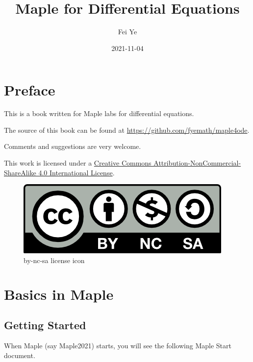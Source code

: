 \documentclass[
  12pt]{elegantbook}
\institute{QCC-CUNY}
\title{Maple for Differential Equations}
\author{Fei Ye}
\date{2021-11-04}
\begin{document}
\maketitle

{
\setcounter{tocdepth}{0}
\tableofcontents
}
\mainmatter

\hypersetup{pageanchor=true}

\captionsetup[figure]{labelformat=empty}
\captionsetup[subfigure]{labelformat=empty}

\hypertarget{preface}{%
\chapter*{Preface}\label{preface}}

This is a book written for Maple labs for differential equations.

The source of this book can be found at \url{https://github.com/fyemath/maple4ode}.

Comments and suggestions are very welcome.

This work is licensed under a \href{https://creativecommons.org/licenses/by-nc-sa/4.0/}{Creative Commons Attribution-NonCommercial-ShareAlike 4.0 International License}.

\begin{figure}
\centering
\includegraphics{figs/by-nc-sa.png}
\caption{by-nc-sa license icon}
\end{figure}

\hypertarget{basics-in-maple}{%
\chapter{Basics in Maple}\label{basics-in-maple}}

\hypertarget{getting-started}{%
\section{Getting Started}\label{getting-started}}

When Maple (say Maple2021) starts, you will see the following Maple Start document.
\end{document}
